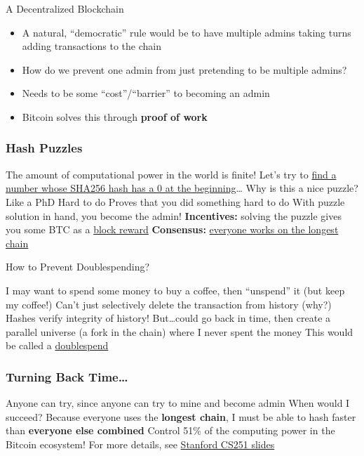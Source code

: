 \documentclass[aspectratio=169]{beamer}
\begin{document}
\begin{frame}{A Decentralized Blockchain}

\begin{itemize}
    \item  A natural, “democratic” rule would be to have multiple admins taking turns adding transactions to the chain \pause 
    \item How do we prevent one admin from just pretending to be multiple admins? \pause 
    \item Needs to be some “cost”/“barrier” to becoming an admin \pause 
    \item Bitcoin solves this through \textbf{proof of work}
\end{itemize}
    
\end{frame}


\begin{frame}
\frametitle{Hash Puzzles}

\bi
\m The amount of computational power in the world is finite!
\m Let's try to \href{https://emn178.github.io/online-tools/sha256.html}{find a number whose SHA256 hash has a 0 at the beginning}\ldots \pause 
\m Why is this a nice puzzle? Like a PhD
\be
\m Hard to do
\m Proves that you did something hard to do \pause 
\ee
\m With puzzle solution in hand, you become the admin!
\m \textbf{Incentives:} solving the puzzle gives you some BTC as a \ul{block reward}
\m \textbf{Consensus:} \ul{everyone works on the longest chain} 
\ei

\end{frame}



\begin{frame}{How to Prevent Doublespending?}
    
\bi
\m I may want to spend some money to buy a coffee, then ``unspend'' it (but keep my coffee!)
\m Can't just selectively delete the transaction from history (why?)\pause 
\bi
\m Hashes verify integrity of history!
\ei
\m But\ldots could go back in time, then create a parallel universe (a fork in the chain) where I never spent the money 
\bi
\m This would be called a \ul{doublespend}
\ei
\ei

\end{frame}

\begin{frame}
\frametitle{Turning Back Time\ldots}

\bi
\m Anyone can try, since anyone can try to mine and become admin
\m When would I succeed? \pause
\bi
\m Because everyone uses the \textbf{longest chain}, I must be able to hash faster than \textbf{everyone else combined}
\m Control 51\% of the computing power in the Bitcoin ecosystem!
\ei
\m For more details, see \href{https://cs251.stanford.edu/lectures/lecture5.pdf}{Stanford CS251 slides}
\ei

\end{frame}
\end{document}
